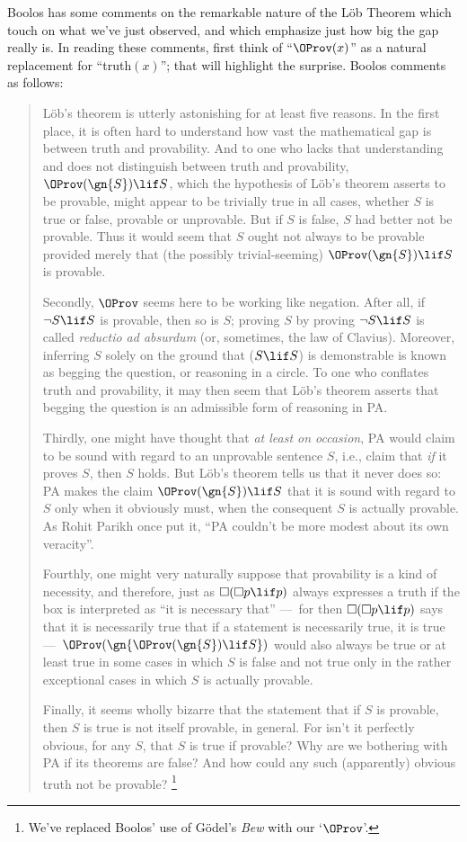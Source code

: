 Boolos has some  comments on the remarkable nature of the L\"ob
Theorem which touch on what we've just observed, and which emphasize
just how big the gap really is. In reading these comments, first think
of ``$\OProv(x)$'' as a natural replacement for ``truth$(x)$''; that will
highlight the surprise. Boolos comments as follows:
\begin{quotation}
L\"ob's theorem is utterly astonishing for at least five reasons. In
the first place, it is often hard to understand how vast the
mathematical gap is between truth and provability. And to one who
lacks that understanding and does not distinguish between truth and
provability, $\OProv(\gn{S})\lif S$, which the hypothesis of
L\"ob's theorem asserts to be provable, might appear to be trivially
true in all cases, whether $S$ is true or false, provable or
unprovable. But if $S$ is false,  $S$ had better not be provable. Thus
it would seem that $S$ ought not always to be provable provided merely
that (the possibly trivial-seeming) $\OProv(\gn{S})\lif S$ is
provable.

Secondly, $\OProv$ seems here to be working like negation. After
all, if $\lnot S \lif S$ is provable, then so is $S$; proving $S$ by
proving $\lnot S\lif S$ is called \emph{reductio ad absurdum} (or,
sometimes, the law of Clavius). Moreover, inferring $S$ solely on the
ground that ($S\lif S$) is demonstrable is known as begging the
question, or reasoning in a circle. To one who conflates truth and
provability, it may then seem that L\"ob's theorem asserts that
begging the question is an admissible form of reasoning in PA.

Thirdly, one might have thought that \emph{at least on occasion}, PA
would claim to be sound with regard to an unprovable sentence $S$,
i.e., claim that \emph{if} it proves $S$, then $S$ holds. But L\"ob's
theorem tells us that it never does so: PA makes the claim
$\OProv(\gn{S})\lif S$ that it is sound with regard to $S$ only
when it obviously must, when the consequent $S$ is actually provable.
As Rohit Parikh once put it, ``PA couldn't be more modest about its
own veracity''.

Fourthly, one might very naturally suppose that provability is a kind
of necessity, and therefore, just as $\Box(\Box p \lif p)$ always
expresses a truth if the box is interpreted as ``it is necessary
that'' ---~for then $\Box(\Box p \lif p)$ says that it is necessarily
true that if a statement is necessarily true, it is true
---~$\OProv(\gn{\OProv(\gn{S})\lif S})$ would also always
be true or at least true in some cases in which $S$ is false and not
true only in the rather exceptional cases in which $S$ is actually
provable.

Finally, it seems wholly bizarre that the statement that if $S$ is
provable, then $S$ is true is not itself provable, in general. For
isn't it perfectly obvious, for any $S$, that $S$ is true if provable?
Why are we bothering with PA if its theorems are false? And how could
any such (apparently) obvious truth not be provable?
\citep[pp.~54--55]{Boolos1993}\footnote{We've replaced Boolos' use
of G\"odel's \textit{Bew} with our `$\OProv$'.}
\end{quotation}

